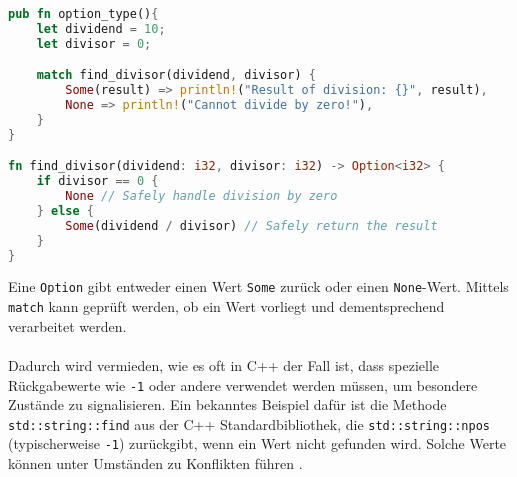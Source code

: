 \begin{lstlisting}[language=Rust, caption=Option-Typ, label=list:channel]
pub fn option_type(){
    let dividend = 10;
    let divisor = 0;

    match find_divisor(dividend, divisor) {
        Some(result) => println!("Result of division: {}", result),
        None => println!("Cannot divide by zero!"),
    }
}

fn find_divisor(dividend: i32, divisor: i32) -> Option<i32> {
    if divisor == 0 {
        None // Safely handle division by zero
    } else {
        Some(dividend / divisor) // Safely return the result
    }
}
\end{lstlisting}
\noindent
Eine \texttt{Option} gibt entweder einen Wert \texttt{Some} zurück oder einen \texttt{None}-Wert. Mittels \texttt{match} kann geprüft werden, ob ein Wert vorliegt und dementsprechend verarbeitet werden.\\
\\
Dadurch wird vermieden, wie es oft in C++ der Fall ist, dass spezielle Rückgabewerte wie \texttt{-1} oder andere verwendet werden müssen, um besondere Zustände zu signalisieren. 
Ein bekanntes Beispiel dafür ist die Methode \texttt{std::string::find} aus der C++ Standardbibliothek, die \texttt{std::string::npos} (typischerweise \texttt{-1}) zurückgibt, wenn ein Wert nicht gefunden wird. 
Solche Werte können unter Umständen zu Konflikten führen \cite{cppreference_string_find} \cite{cppreference_string_npos}. 
